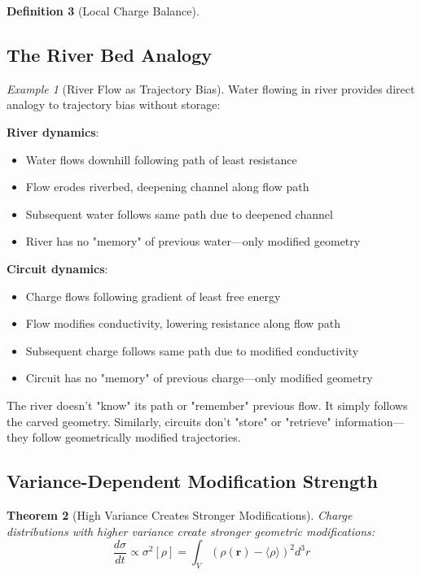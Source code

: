 \documentclass[12pt,a4paper]{article}
\theoremstyle{plain}
\newtheorem{theorem}{Theorem}[section]
\theoremstyle{definition}
\newtheorem{definition}[theorem]{Definition}
\theoremstyle{remark}
\newtheorem{example}[theorem]{Example}
\begin{document}
\begin{definition}[Local Charge Balance]
\subsection{The River Bed Analogy}

\begin{example}[River Flow as Trajectory Bias]
\label{ex:river_flow}
Water flowing in river provides direct analogy to trajectory bias without storage:

\textbf{River dynamics}:
\begin{itemize}
\item Water flows downhill following path of least resistance
\item Flow erodes riverbed, deepening channel along flow path
\item Subsequent water follows same path due to deepened channel
\item River has no "memory" of previous water—only modified geometry
\end{itemize}

\textbf{Circuit dynamics}:
\begin{itemize}
\item Charge flows following gradient of least free energy
\item Flow modifies conductivity, lowering resistance along flow path
\item Subsequent charge follows same path due to modified conductivity
\item Circuit has no "memory" of previous charge—only modified geometry
\end{itemize}

The river doesn't "know" its path or "remember" previous flow. It simply follows the carved geometry. Similarly, circuits don't "store" or "retrieve" information—they follow geometrically modified trajectories.
\end{example}

\subsection{Variance-Dependent Modification Strength}

\begin{theorem}[High Variance Creates Stronger Modifications]
\label{thm:variance_modification}
Charge distributions with higher variance create stronger geometric modifications:
\begin{equation}
\frac{d\sigma}{dt} \propto \sigma^2[\rho] = \int_V (\rho(\mathbf{r}) - \langle \rho \rangle)^2 d^3r
\end{equation}
\end{theorem}


\end{definition}
\end{document}

